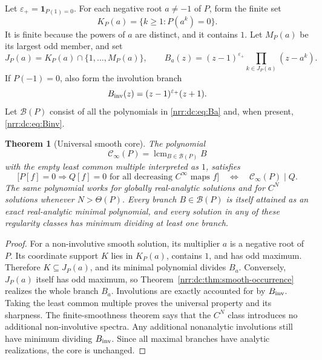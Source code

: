 \documentclass[11pt,letterpaper]{article}
\newtheorem{theorem}{Theorem}[section]
\theoremstyle{definition}
\theoremstyle{remark}
\DeclareMathOperator{\lcm}{lcm}
\newcommand{\smoothcore}{\mathcal C_{\infty}}
\begin{document}
Let $\varepsilon_+=\mathbf1_{P(1)=0}$. For each negative root $a\ne-1$ of
$P$, form the finite set
\begin{equation}
 K_P(a)=\{k\ge1:P(a^k)=0\}.
 \label{nrr:dc:eq:KPa}
\end{equation}
It is finite because the powers of $a$ are distinct, and it contains
$1$. Let $M_P(a)$ be its largest odd member, and set
\begin{equation}
 J_P(a)=K_P(a)\cap\{1,\ldots,M_P(a)\},\qquad
 B_a(z)=(z-1)^{\varepsilon_+}\prod_{k\in J_P(a)}(z-a^k).
 \label{nrr:dc:eq:Ba}
\end{equation}
If $P(-1)=0$, also form the involution branch
\begin{equation}
 B_{\rm inv}(z)=(z-1)^{\varepsilon_+}(z+1).
 \label{nrr:dc:eq:Binv}
\end{equation}
Let $\mathcal B(P)$ consist of all the polynomials in
\eqref{nrr:dc:eq:Ba} and, when present, \eqref{nrr:dc:eq:Binv}.

\begin{theorem}[Universal smooth core]
\label{nrr:dc:thm:smooth-core}
The polynomial
\begin{equation}
 \boxed{\ \smoothcore(P)=\lcm_{B\in\mathcal B(P)}B\ }
 \label{nrr:dc:eq:smoothcore}
\end{equation}
with the empty least common multiple interpreted as $1$, satisfies
\begin{equation}
 \bigl[P[f]=0\Rightarrow Q[f]=0
       \text{ for all decreasing }C^\infty\text{ maps }f\bigr]
 \quad\Longleftrightarrow\quad \smoothcore(P)\mid Q.
 \label{nrr:dc:eq:smooth-universal}
\end{equation}
The same polynomial works for globally real-analytic solutions and
for $C^N$ solutions whenever $N>\Theta(P)$.
Every branch $B\in\mathcal B(P)$ is itself attained as an exact
real-analytic minimal polynomial, and every solution in any of these
regularity classes has minimum dividing at least one branch.
\end{theorem}
\begin{proof}
For a non-involutive smooth solution, its multiplier $a$ is a negative
root of $P$. Its coordinate support $K$ lies in $K_P(a)$, contains
$1$, and has odd maximum. Therefore $K\subseteq J_P(a)$, and its
minimal polynomial divides $B_a$. Conversely, $J_P(a)$ itself has
odd maximum, so Theorem~\ref{nrr:dc:thm:smooth-occurrence} realizes the
whole branch $B_a$. Involutions are exactly accounted for by $B_{\rm inv}$.
Taking the least common multiple proves the universal property and
its sharpness.
The finite-smoothness theorem says that the $C^N$ class introduces
no additional non-involutive spectra. Any additional nonanalytic
involutions still have minimum dividing $B_{\rm inv}$. Since all
maximal branches have analytic realizations, the core is unchanged.
\end{proof}
\end{document}
